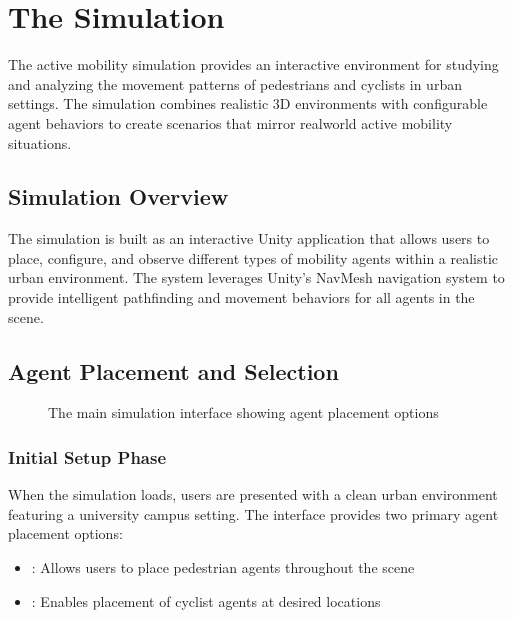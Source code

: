 \documentclass[letterpaper,10pt,english]{jupyterBook}
\begin{document}
\sphinxstepscope


\chapter{The Simulation}
\label{\detokenize{The Simulation:the-simulation}}\label{\detokenize{The Simulation::doc}}
\sphinxAtStartPar
The active mobility simulation provides an interactive environment for studying and analyzing the movement patterns of pedestrians and cyclists in urban settings. The simulation combines realistic 3D environments with configurable agent behaviors to create scenarios that mirror real\sphinxhyphen{}world active mobility situations.


\section{Simulation Overview}
\label{\detokenize{The Simulation:simulation-overview}}
\sphinxAtStartPar
The simulation is built as an interactive Unity application that allows users to place, configure, and observe different types of mobility agents within a realistic urban environment. The system leverages Unity’s NavMesh navigation system to provide intelligent pathfinding and movement behaviors for all agents in the scene.


\section{Agent Placement and Selection}
\label{\detokenize{The Simulation:agent-placement-and-selection}}
\begin{figure}[htbp]
\centering
\capstart

\noindent{}
\caption{The main simulation interface showing agent placement options}\label{\detokenize{The Simulation:simulation-interface}}\end{figure}


\subsection{Initial Setup Phase}
\label{\detokenize{The Simulation:initial-setup-phase}}
\sphinxAtStartPar
When the simulation loads, users are presented with a clean urban environment featuring a university campus setting. The interface provides two primary agent placement options:
\begin{itemize}
\item {} 
\sphinxAtStartPar
{}: Allows users to place pedestrian agents throughout the scene

\item {} 
\sphinxAtStartPar
{}: Enables placement of cyclist agents at desired locations

\end{itemize}
\end{document}
